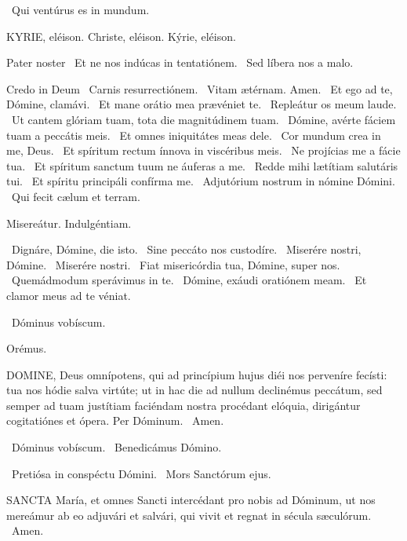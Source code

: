  \V\ Qui ventúrus es in mundum.


KYRIE, eléison. Christe, eléison. Kýrie, eléison.

Pater noster  \V\ Et ne nos indúcas in tentatiónem. \R\ Sed líbera nos a malo.

Credo in Deum  \V\ Carnis resurrectiónem. \R\ Vitam ætérnam. Amen. \V\ Et ego ad te, Dómine, clamávi. \R\ Et mane orátio mea prævéniet te. \V\ Repleátur os meum laude. \R\ Ut cantem glóriam tuam, tota die magnitúdinem tuam. \V\ Dómine, avérte fáciem tuam a peccátis meis. \R\ Et omnes iniquitátes meas dele. \V\ Cor mundum crea in me, Deus. \R\ Et spíritum rectum ínnova in viscéribus meis. \V\ Ne projícias me a fácie tua. \R\ Et spíritum sanctum tuum ne áuferas a me. \V\ Redde mihi lætítiam salutáris tui. \R\ Et spíritu principáli confírma me. \V\ Adjutórium nostrum in nómine Dómini. \R\ Qui fecit cælum et terram.

 Misereátur. Indulgéntiam.

\V\ Dignáre, Dómine, die isto. \R\ Sine peccáto nos custodíre. \V\ Miserére nostri, Dómine. \R\ Miserére nostri. \V\ Fiat misericórdia tua, Dómine, super nos. \R\ Quemádmodum sperávimus in te. \V\ Dómine, exáudi oratiónem meam. \R\ Et clamor meus ad te véniat.

\V\ Dóminus vobíscum.

Orémus. 

\lettrine[lines=2]{D}{OMINE}, Deus omnípotens, qui ad princípium hujus diéi nos perveníre fecísti: tua nos hódie salva virtúte; ut in hac die ad nullum declinémus peccátum, sed semper ad tuam justítiam faciéndam nostra procédant elóquia, dirigántur cogitatiónes et ópera. Per Dóminum. \R\ Amen.

\V\ Dóminus vobíscum. \V\ Benedicámus Dómino.



\V\ Pretiósa in conspéctu Dómini. \R\ Mors Sanctórum ejus.



\lettrine[lines=2]{S}{ANCTA} María, et omnes Sancti intercédant pro nobis ad Dóminum, ut nos mereámur ab eo adjuvári et salvári, qui vivit et regnat in sécula sæculórum. \R\ Amen.

